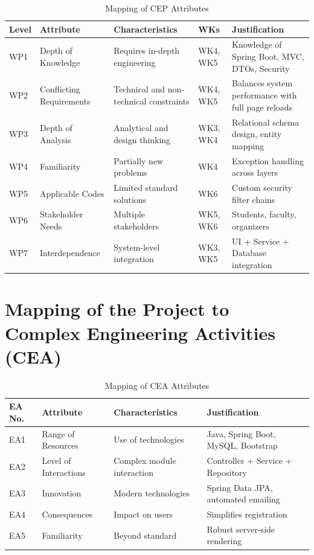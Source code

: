 \documentclass[12pt]{report}
\begin{document}
\begin{table}[h!]
\centering
\footnotesize
\renewcommand{\arraystretch}{1.3}
\begin{tabular}{|p{1.2cm}|p{2.8cm}|p{4cm}|p{1.5cm}|p{5cm}|}
\hline
\textbf{Level} & \textbf{Attribute} & \textbf{Characteristics} & \textbf{WKs} & \textbf{Justification} \\
\hline
WP1 & Depth of Knowledge & Requires in-depth engineering & WK4, WK5 & Knowledge of Spring Boot, MVC, DTOs, Security \\
\hline
WP2 & Conflicting Requirements & Technical and non-technical constraints & WK4, WK5 & Balances system performance with full page reloads \\
\hline
WP3 & Depth of Analysis & Analytical and design thinking & WK3, WK4 & Relational schema design, entity mapping \\
\hline
WP4 & Familiarity & Partially new problems & WK4 & Exception handling across layers \\
\hline
WP5 & Applicable Codes & Limited standard solutions & WK6 & Custom security filter chains \\
\hline
WP6 & Stakeholder Needs & Multiple stakeholders & WK5, WK6 & Students, faculty, organizers \\
\hline
WP7 & Interdependence & System-level integration & WK3, WK5 & UI + Service + Database integration \\
\hline
\end{tabular}
\caption{Mapping of CEP Attributes}
\end{table}

\vspace{0.5cm}

\section{Mapping of the Project to Complex Engineering Activities (CEA)}

\begin{table}[h!]
\centering
\footnotesize
\renewcommand{\arraystretch}{1.3}
\begin{tabular}{|p{1.5cm}|p{3cm}|p{4.5cm}|p{5cm}|}
\hline
\textbf{EA No.} & \textbf{Attribute} & \textbf{Characteristics} & \textbf{Justification} \\
\hline
EA1 & Range of Resources & Use of technologies & Java, Spring Boot, MySQL, Bootstrap \\
\hline
EA2 & Level of Interactions & Complex module interaction & Controller + Service + Repository \\
\hline
EA3 & Innovation & Modern technologies & Spring Data JPA, automated emailing \\
\hline
EA4 & Consequences & Impact on users & Simplifies registration \\
\hline
EA5 & Familiarity & Beyond standard & Robust server-side rendering \\
\hline
\end{tabular}
\caption{Mapping of CEA Attributes}
\end{table}
\end{document}
